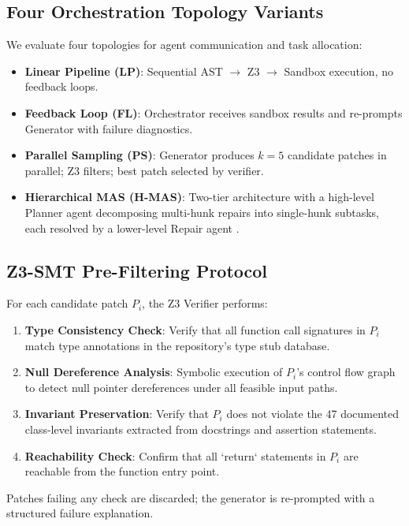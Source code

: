 \documentclass[10pt,twocolumn,letterpaper]{article}
\begin{document}
\subsection{Four Orchestration Topology Variants}


We evaluate four topologies for agent communication and task allocation:

\begin{itemize}
  \item \textbf{Linear Pipeline (LP)}: Sequential AST $\rightarrow$ Z3 $\rightarrow$ Sandbox execution, no feedback loops.
  \item \textbf{Feedback Loop (FL)}: Orchestrator receives sandbox results and re-prompts Generator with failure diagnostics.
  \item \textbf{Parallel Sampling (PS)}: Generator produces $k = 5$ candidate patches in parallel; Z3 filters; best patch selected by verifier.
  \item \textbf{Hierarchical MAS (H-MAS)}: Two-tier architecture with a high-level Planner agent decomposing multi-hunk repairs into single-hunk subtasks, each resolved by a lower-level Repair agent \cite{arxiv_2412_06333}.
\end{itemize}


\subsection{Z3-SMT Pre-Filtering Protocol}


For each candidate patch $P_i$, the Z3 Verifier performs:

\begin{enumerate}
  \item \textbf{Type Consistency Check}: Verify that all function call signatures in $P_i$ match type annotations in the repository's type stub database.
  \item \textbf{Null Dereference Analysis}: Symbolic execution of $P_i$'s control flow graph to detect null pointer dereferences under all feasible input paths.
  \item \textbf{Invariant Preservation}: Verify that $P_i$ does not violate the 47 documented class-level invariants extracted from docstrings and assertion statements.
  \item \textbf{Reachability Check}: Confirm that all `return` statements in $P_i$ are reachable from the function entry point.
\end{enumerate}

Patches failing any check are discarded; the generator is re-prompted with a structured failure explanation.
\end{document}
